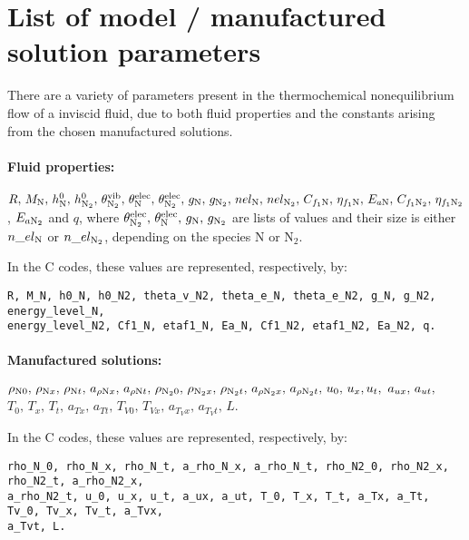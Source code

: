 \section{List of model / manufactured solution parameters}\label{Appendix:01}

There are a variety of parameters present in the thermochemical nonequilibrium flow of a inviscid fluid, due to both fluid properties and the constants arising from the chosen manufactured solutions.

\paragraph{Fluid properties:} $R , \, M_{\text{N}} , \,  h^0_{\text{N}} , \, h^0_{\text{N}_2} , \, \theta^{\text{vib}}_{\text{N}_2} , \, \theta^{\text{elec}}_{\text{N}} , \,  \theta^{\text{elec}}_{\text{N}_2} , \,   g_{\text{N}} , \,  g_{\text{N}_2} , \,  nel_{\text{N}} , \, nel_{\text{N}_2} , \,  C_{f_1 \text{N}} , \,  \eta_{f_1 \text{N}}  , \, E_{a\text{N}} , \,  C_{f_1 \text{N}_2} , \,  \eta_{f_1 \text{N}_2} $,  $E_{a\text{N}_2}$ and $ q$,  
where $ \theta^{\text{elec}}_{\text{N}_2} , \,  \theta^{\text{elec}}_{\text{N}} , \,  g_{\text{N}} , \,  g_{\text{N}_2}$ are lists of values and their size is either $n\_el_{\text{N}}$ or $n\_el_{\text{N}_2}$,  depending on the species N or N$_2$.

\vspace{10pt}
\noindent
In the C codes, these values are represented, respectively, by:
\vspace{-5pt}
\begin{verbatim}
R, M_N, h0_N, h0_N2, theta_v_N2, theta_e_N, theta_e_N2, g_N, g_N2, energy_level_N, 
energy_level_N2, Cf1_N, etaf1_N, Ea_N, Cf1_N2, etaf1_N2, Ea_N2, q.

\end{verbatim}


\paragraph{Manufactured solutions:} $\rho_{\text{N} 0} , \,  \rho_{\text{N} x} , \,  \rho_{\text{N} t}, \, a_{  \rho \text{N} x } ,\, a_{ \rho \text{N} t},\,  \rho_{\text{N}_2 0} , \, \rho_{\text{N}_2 x} , \, \rho_{\text{N}_2 t},\,  a_{ \rho \text{N}_2 x } , \,a_{ \rho \text{N}_2 t},\,  u_{0} , \, u_{x}  ,  u_t,\, \, a_{u x}  , \,  a_{ut},\,$ \\
$ T_{0} , \, T_{x} , \, T_t,\,  a_{T x} , \, a_{T t} , \,  T_{V0} , \, T_{Vx}  , \,  a_{T_V x} , \,a_{T_V t},\, L $.




\vspace{10pt}
\noindent
In the C codes, these values are represented, respectively, by:
\vspace{-5pt}
\begin{verbatim} 
rho_N_0, rho_N_x, rho_N_t, a_rho_N_x, a_rho_N_t, rho_N2_0, rho_N2_x, rho_N2_t, a_rho_N2_x, 
a_rho_N2_t, u_0, u_x, u_t, a_ux, a_ut, T_0, T_x, T_t, a_Tx, a_Tt, Tv_0, Tv_x, Tv_t, a_Tvx, 
a_Tvt, L.
\end{verbatim}




